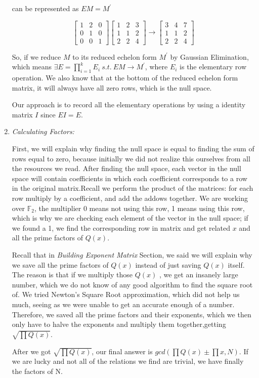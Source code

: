 \documentclass[12pt]{article} %
\newcommand{\itemgap}[1][2]{\vspace{#1mm}}
\begin{document}
\begin{enumerate}
		can be represented as $EM=M^\prime$
		
		$$
		\begin{bmatrix}
		1 & 2 & 0 \\
		0 & 1 & 0 \\
		0 & 0 & 1
		\end{bmatrix}
		\begin{bmatrix}
		1 & 2 & 3 \\
		1 & 1 & 2 \\
		2 & 2 & 4
		\end{bmatrix} \rightarrow
		\begin{bmatrix}
		3 & 4 & 7 \\
		1 & 1 & 2 \\
		2 & 2 & 4
		\end{bmatrix}
		$$
		
		So, if we reduce $M$ to its reduced echelon form $M^\prime$ by Gaussian Elimination, which means $\exists E=\prod_{i=1}^k{E_i}\ s.t.\ EM \rightarrow M^\prime$, where $E_i$ is the elementary row operation. We also know that at the bottom of the reduced echelon form matrix, it will always have all zero rows, which is the null space. 
		
		Our approach is to record all the elementary operations by using a identity matrix $I$ since $EI=E$.
		
		\item \textit{Calculating Factors:} \itemgap
		
		First, we will explain why finding the null space is equal to finding the sum of rows equal to zero, because initially we did not realize this ourselves from all the resources we read. After finding the null space, each vector in the null space will contain coefficients in which each coefficient corresponds to a row in the original matrix.Recall we perform the product of the matrices: for each row multiply by a coefficient, and add the addows together. We are working over $\mathbb{F}_2$, the multiplier 0 means not using this row, 1 means using this row, which is why we are checking each element of the vector in the null space; if we found a 1, we find the corresponding row in matrix and get related $x$ and all the prime factors of $Q(x)$. 
		
		Recall that in \textit{Building Exponent Matrix} Section, we said we will explain why we save all the prime factors of $Q(x)$ instead of just saving $Q(x)$ itself. The reason is that if we multiply those $Q(x)$ , we get an insanely large number, which we do not know of any good algorithm to find the square root of. We tried Newton's Square Root approximation, which did not help us much, seeing as we were unable to get an accurate enough of a number. Therefore, we saved all the prime factors and their exponents, which we then only have to halve the exponents and multiply them together,getting $\sqrt{\prod Q(x)}$. 
		
		After we got $\sqrt{\prod Q(x)}$, our final answer is $gcd\left(\prod Q(x) \pm \prod x, N\right)$. If we are lucky and not all of the relations we find are trivial, we have finally the factors of N.
		
	\end{enumerate}
	
\end{document}
